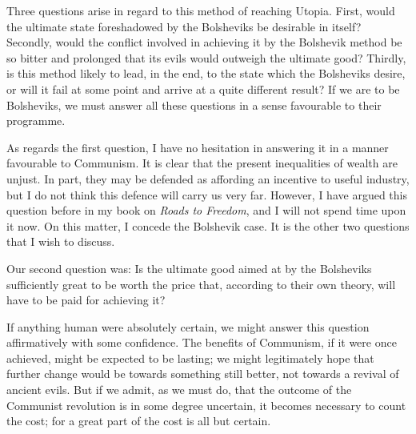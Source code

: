 Three questions arise in regard to this method of reaching Utopia. First, would the ultimate state foreshadowed by the Bolsheviks be desirable in itself? Secondly, would the conflict involved in achieving it by the Bolshevik method be so bitter and prolonged that its evils would outweigh the ultimate good? Thirdly, is this method likely to lead, in the end, to the state which the Bolsheviks desire, or will it fail at some point and arrive at a quite different result? If we are to be Bolsheviks, we must answer all these questions in a sense favourable to their programme.

As regards the first question, I have no hesitation in answering it in a manner favourable to Communism. It is clear that the present inequalities of wealth are unjust. In part, they may be defended as affording an incentive to useful industry, but I do not think this defence will carry us very far. However, I have argued this question before in my book on \emph{Roads to Freedom}, and I will not spend time upon it now. On this matter, I concede the Bolshevik case. It is the other two questions that I wish to discuss.

Our second question was: Is the ultimate good aimed at by the Bolsheviks sufficiently great to be worth the price that, according to their own theory, will have to be paid for achieving it?

If anything human were absolutely certain, we might answer this question affirmatively with some confidence. The benefits of Communism, if it were once achieved, might be expected to be lasting; we might legitimately hope that further change would be towards something still better, not towards a revival of ancient evils. But if we admit, as we must do, that the outcome of the Communist revolution is in some degree uncertain, it becomes necessary to count the cost; for a great part of the cost is all but certain.

